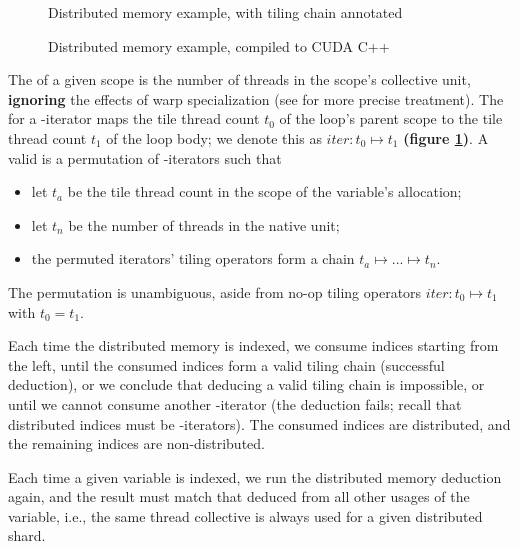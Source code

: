 \begin{figure}[!b]

\caption{Distributed memory example, with tiling chain annotated}
\label{fig:tiling_chain}
\end{figure}

\begin{figure}[!b]

\caption{Distributed memory example, compiled to CUDA C++}
\label{fig:simple_dist_cxx}
\end{figure}

\filbreak
{} 
The  of a given scope is the number of threads in the scope's collective unit, \textbf{ignoring} the effects of warp specialization (see  for more precise treatment).
The  for a -iterator maps the tile thread count $t_0$ of the loop's parent scope to the tile thread count $t_1$ of the loop body; we denote this as $\mathit{iter}: t_0 \mapsto t_1$ \textbf{(figure \ref{fig:tiling_chain})}.
A valid  is a permutation of -iterators such that
\begin{itemize}
  \item let $t_a$ be the tile thread count in the scope of the variable's allocation;
  \item let $t_n$ be the number of threads in the native unit;
  \item the permuted iterators' tiling operators form a chain $t_a \mapsto ... \mapsto t_n$.
\end{itemize}
\filbreak
The permutation is unambiguous, aside from no-op tiling operators $\mathit{iter}: t_0 \mapsto t_1$ with $t_0 = t_1$.

\filbreak
Each time the distributed memory is indexed, we consume indices starting from the left, until the consumed indices form a valid tiling chain (successful deduction), or we conclude that deducing a valid tiling chain is impossible, or until we cannot consume another -iterator (the deduction fails; recall that distributed indices must be -iterators).
The consumed indices are distributed, and the remaining indices are non-distributed.

\filbreak
{} Each time a given variable is indexed, we run the distributed memory deduction again, and the result must match that deduced from all other usages of the variable, i.e., the same thread collective is always used for a given distributed shard.


